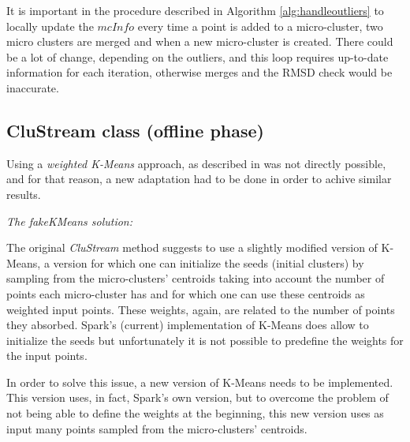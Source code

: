 It is important in the procedure described in Algorithm \ref{alg:handleoutliers} to locally update the $mcInfo$ every time a point is added to a micro-cluster, two micro clusters are merged and when a new micro-cluster is created. There could be a lot of change, depending on the outliers, and this loop requires up-to-date information for each iteration, otherwise merges and the RMSD check would be inaccurate.


\subsection{CluStream class (offline phase)}

Using a \textit{weighted K-Means} approach, as described in \cite{clustreamOrig} was not directly possible, and for that reason, a new adaptation had to be done in order to achive similar results.


\textit{The fakeKMeans solution:}

The original \textit{CluStream} method suggests to use a slightly modified version of K-Means, a version for which one can initialize the seeds (initial clusters) by sampling from the micro-clusters' centroids taking into account the number of points each micro-cluster has and for which one can use these centroids as weighted input points. These weights, again, are related to the number of points they absorbed. Spark's (current) implementation of K-Means does allow to initialize the seeds but unfortunately it is not possible to predefine the weights for the input points.

In order to solve this issue, a new version of K-Means needs to be implemented. This version uses, in fact, Spark's own version, but to overcome the problem of not being able to define the weights at the beginning, this new version uses as input many points sampled from the micro-clusters' centroids.